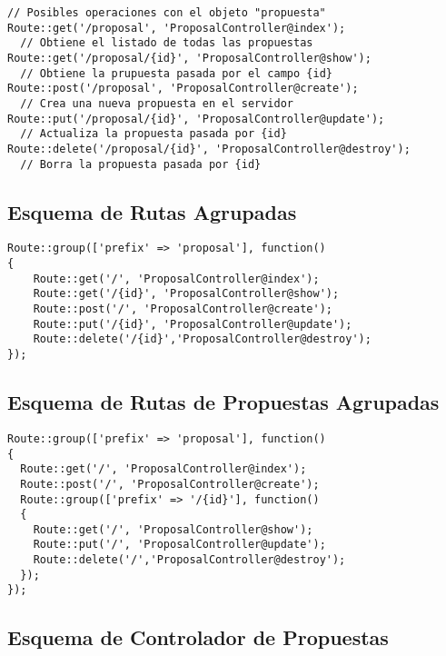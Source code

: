 \lstset{
  language        = php}
\begin{lstlisting}[frame=single]
// Posibles operaciones con el objeto "propuesta"
Route::get('/proposal', 'ProposalController@index');
  // Obtiene el listado de todas las propuestas
Route::get('/proposal/{id}', 'ProposalController@show');
  // Obtiene la prupuesta pasada por el campo {id}
Route::post('/proposal', 'ProposalController@create');
  // Crea una nueva propuesta en el servidor
Route::put('/proposal/{id}', 'ProposalController@update');
  // Actualiza la propuesta pasada por {id}
Route::delete('/proposal/{id}', 'ProposalController@destroy');
  // Borra la propuesta pasada por {id}
\end{lstlisting}

\subsection{Esquema de Rutas Agrupadas}\label{ssec:codeRoutesGroupe}

\lstset{
  language        = php}
\begin{lstlisting}[frame=single]
Route::group(['prefix' => 'proposal'], function()
{
    Route::get('/', 'ProposalController@index');
    Route::get('/{id}', 'ProposalController@show');
    Route::post('/', 'ProposalController@create');
    Route::put('/{id}', 'ProposalController@update');
    Route::delete('/{id}','ProposalController@destroy');
});
\end{lstlisting}

\subsection{Esquema de Rutas de Propuestas Agrupadas}\label{ssec:codeRoutesGroupeProposals}

\lstset{
  language        = php}
\begin{lstlisting}[frame=single]
Route::group(['prefix' => 'proposal'], function()
{
  Route::get('/', 'ProposalController@index');
  Route::post('/', 'ProposalController@create');
  Route::group(['prefix' => '/{id}'], function()
  {
    Route::get('/', 'ProposalController@show');
    Route::put('/', 'ProposalController@update');
    Route::delete('/','ProposalController@destroy');
  });
});
\end{lstlisting}

\subsection{Esquema de Controlador de Propuestas}\label{ssec:codeControllerProposals}

